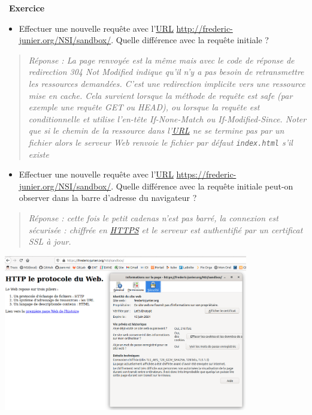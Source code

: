 \documentclass[
  11pt,
]{article}
\newcommand{\passthrough}[1]{#1}
\providecommand{\tightlist}{%
  \setlength{\itemsep}{0pt}\setlength{\parskip}{0pt}}
\newcounter{exo}
\newenvironment{exercice}[1]
{\par \medskip   \addtocounter{exo}{1} \noindent  
\begin{bclogo}[arrondi =0.1,   noborder = true, logo=\bccrayon, marge=4]{~\textbf{Exercice} \textbf{\theexo} {\itshape #1} }  \par}
{
\end{bclogo}
 \par \bigskip }
\begin{document}
\begin{exercice}{}
\begin{enumerate}
  \begin{itemize}
  \tightlist
  \item
    Effectuer une nouvelle requête avec
    l'\href{https://developer.mozilla.org/fr/docs/Glossaire/URL}{URL}
    \url{http://frederic-junier.org/NSI/sandbox/}. Quelle différence
    avec la requête initiale ?
  \end{itemize}

  \begin{quote}
  \emph{Réponse : La page renvoyée est la même mais avec le code de
  réponse de redirection 304 Not Modified indique qu'il n'y a pas besoin
  de retransmettre les ressources demandées. C'est une redirection
  implicite vers une ressource mise en cache. Cela survient lorsque la
  méthode de requête est safe (par exemple une requête GET ou HEAD), ou
  lorsque la requête est conditionnelle et utilise l'en-tête
  If-None-Match ou If-Modified-Since. Noter que si le chemin de la
  ressource dans l'\url{URL} ne se termine pas par un fichier alors le
  serveur Web renvoie le fichier par défaut
  \passthrough{\lstinline!index.html!} s'il existe}
  \end{quote}

  \begin{itemize}
  \tightlist
  \item
    Effectuer une nouvelle requête avec
    l'\href{https://developer.mozilla.org/fr/docs/Glossaire/URL}{URL}
    \url{https://frederic-junier.org/NSI/sandbox/}. Quelle différence
    avec la requête initiale peut-on observer dans la barre d'adresse du
    navigateur ?
  \end{itemize}

  \begin{quote}
  \emph{Réponse : cette fois le petit cadenas n'est pas barré, la
  connexion est sécurisée : chiffrée en \url{HTTPS} et le serveur est
  authentifié par un certificat SSL à jour.}
  \end{quote}

  \includegraphics[width=0.8\textwidth,height=\textheight]{images/sandbox_https.png}\\


\end{enumerate}
\end{exercice}
\end{document}
